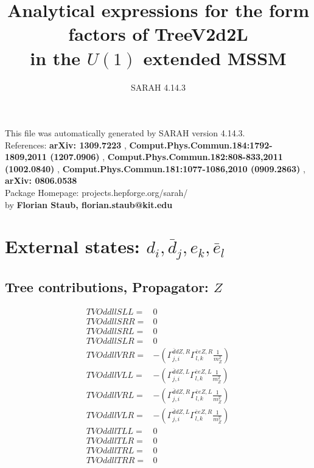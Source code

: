 \documentclass[A4,landscape]{article}
\begin{document}
\title{Analytical expressions for the form factors of TreeV2d2L\\ in the $U(1)$ extended MSSM } 
 \author{SARAH 4.14.3} 
 \maketitle 
 \vspace{10cm} 
This file was automatically generated by SARAH version 4.14.3.  \\ 
References: {\bf arXiv: 1309.7223 }, {\bf Comput.Phys.Commun.184:1792-1809,2011 (1207.0906) }, {\bf Comput.Phys.Commun.182:808-833,2011 (1002.0840) }, {\bf Comput.Phys.Commun.181:1077-1086,2010 (0909.2863) }, {\bf arXiv: 0806.0538 } \\ 
Package Homepage: projects.hepforge.org/sarah/ \\ 
by {\bf Florian Staub, florian.staub@kit.edu} 
 \pagebreak 
 \tableofcontents 
 \pagebreak 
\section{External states: ${d_{{i}}, \bar{d}_{{j}}, e_{{k}}, \bar{e}_{{l}}}$} 
\subsection{Tree contributions, Propagator: $Z$} 

\begin{align} 
  TVOddllSLL= & 0 \\ 
  TVOddllSRR= & 0 \\ 
  TVOddllSRL= & 0 \\ 
  TVOddllSLR= & 0 \\ 
  TVOddllVRR= & -(\Gamma^{\bar{d}d Z ,R}_{j, i} \Gamma^{\bar{e}e Z ,R}_{l, k} \frac{1}{m^2_{Z}}) \\ 
  TVOddllVLL= & -(\Gamma^{\bar{d}d Z ,L}_{j, i} \Gamma^{\bar{e}e Z ,L}_{l, k} \frac{1}{m^2_{Z}}) \\ 
  TVOddllVRL= & -(\Gamma^{\bar{d}d Z ,R}_{j, i} \Gamma^{\bar{e}e Z ,L}_{l, k} \frac{1}{m^2_{Z}}) \\ 
  TVOddllVLR= & -(\Gamma^{\bar{d}d Z ,L}_{j, i} \Gamma^{\bar{e}e Z ,R}_{l, k} \frac{1}{m^2_{Z}}) \\ 
  TVOddllTLL= & 0 \\ 
  TVOddllTLR= & 0 \\ 
  TVOddllTRL= & 0 \\ 
  TVOddllTRR= & 0 \\ 
\end{align} 
\end{document}
